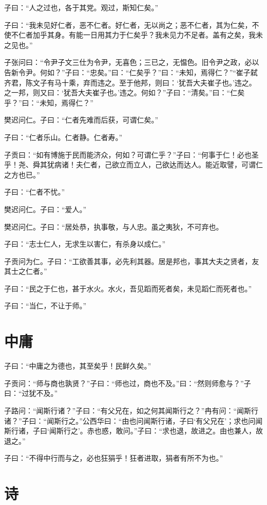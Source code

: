 \documentclass[a5paper]{ctexbook}
\begin{document}
    子曰：“人之过也，各于其党。观过，斯知仁矣。”

    子曰：“我未见好仁者，恶不仁者。好仁者，无以尚之；恶不仁者，其为仁矣，不使不仁者加乎其身。有能一日用其力于仁矣乎？我未见力不足者。盖有之矣，我未之见也。”

    子张问曰：“令尹子文三仕为令尹，无喜色；三已之，无愠色。旧令尹之政，必以告新令尹。何如？”子曰：“忠矣。”曰：“仁矣乎？”曰：“未知，焉得仁？”“崔子弑齐君，陈文子有马十乘，弃而违之。至于他邦，则曰：‘犹吾大夫崔子也。’违之。之一邦，则又曰：‘犹吾大夫崔子也。’违之。何如？”子曰：“清矣。”曰：“仁矣乎？”曰：“未知，焉得仁？”

    樊迟问仁。子曰：“仁者先难而后获，可谓仁矣。”

    子曰：“仁者乐山。仁者静。仁者寿。”

    子贡曰：“如有博施于民而能济众，何如？可谓仁乎？”子曰：“何事于仁！必也圣乎！尧、舜其犹病诸！夫仁者，己欲立而立人，己欲达而达人。能近取譬，可谓仁之方也已。”

    子曰：“仁者不忧。”

    樊迟问仁。子曰：“爱人。”

    樊迟问仁。子曰：“居处恭，执事敬，与人忠。虽之夷狄，不可弃也。

    子曰：“志士仁人，无求生以害仁，有杀身以成仁。”

    子贡问为仁。子曰：“工欲善其事，必先利其器。居是邦也，事其大夫之贤者，友其士之仁者。”

    子曰：“民之于仁也，甚于水火。水火，吾见蹈而死者矣，未见蹈仁而死者也。”

    子曰：“当仁，不让于师。”

    \chapter{中庸}

    子曰：“中庸之为德也，其至矣乎！民鲜久矣。”

    子贡问：“师与商也孰贤？”子曰：“师也过，商也不及。”曰：“然则师愈与？”子曰：“过犹不及。”

    子路问：“闻斯行诸？”子曰：“有父兄在，如之何其闻斯行之？”冉有问：“闻斯行诸？”子曰：“闻斯行之。”公西华曰：“由也问闻斯行诸，子曰‘有父兄在’；求也问闻斯行诸，子曰‘闻斯行之’。赤也惑，敢问。”子曰：“求也退，故进之。由也兼人，故退之。”

    子曰：“不得中行而与之，必也狂狷乎！狂者进取，狷者有所不为也。”

    \chapter{诗}
\end{document}
